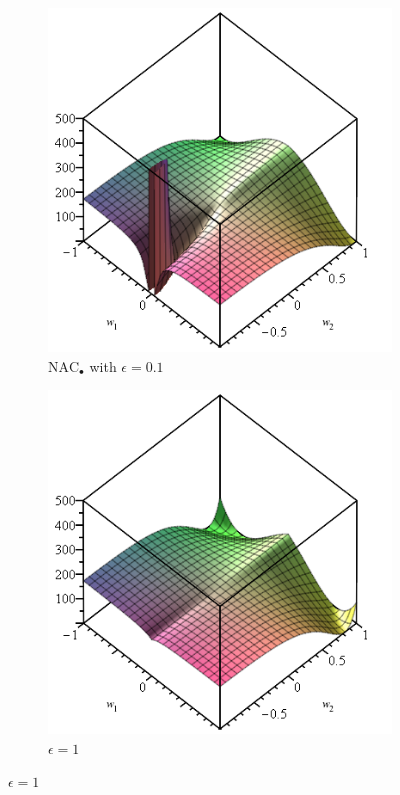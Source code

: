 \begin{figure}[h]
\begin{subfigure}{.33\textwidth}
  \includegraphics[width=\linewidth,trim={0 0 0 4.3cm},clip]{graphics/nac-mul-eps-1em1.png}
  \caption{$\mathrm{NAC}_{\bullet}$ with $\epsilon = 0.1$}
\end{subfigure}
\begin{subfigure}{.33\textwidth}
  \centering
  \includegraphics[width=\linewidth,trim={0 0 0 4.3cm},clip]{graphics/nac-mul-eps-1.png}
  \caption{$\epsilon = 1$}
\end{subfigure}


\end{figure}
